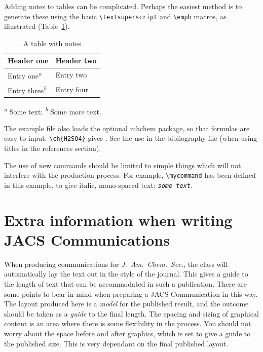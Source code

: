 \documentclass[journal=jpca,manuscript=article]{achemso}
\newcommand*\mycommand[1]{\texttt{\emph{#1}}}
\begin{document}
Adding notes to tables can be complicated.  Perhaps the easiest
method is to generate these using the basic
\texttt{\textbackslash textsuperscript} and
\texttt{\textbackslash emph} macros, as illustrated (Table~\ref{tbl:notes}).
\begin{table}
  \caption{A table with notes}
  \label{tbl:notes}
  \begin{tabular}{ll}
    \hline
    Header one                            & Header two \\
    \hline
    Entry one\textsuperscript{\emph{a}}   & Entry two  \\
    Entry three\textsuperscript{\emph{b}} & Entry four \\
    \hline
  \end{tabular}

  \textsuperscript{\emph{a}} Some text;
  \textsuperscript{\emph{b}} Some more text.
\end{table}

The example file also loads the optional \textsf{mhchem} package, so
that formulas are easy to input: \texttt{\textbackslash ch\{H2SO4\}}
gives .  See the use in the bibliography file (when using
titles in the references section).

The use of new commands should be limited to simple things which will
not interfere with the production process.  For example,
\texttt{\textbackslash mycommand} has been defined in this example,
to give italic, mono-spaced text: \mycommand{some text}.

\section{Extra information when writing JACS Communications}

When producing communications for \emph{J.~Am.\ Chem.\ Soc.}, the
class will automatically lay the text out in the style of the
journal. This gives a guide to the length of text that can be
accommodated in such a publication. There are some points to bear in
mind when preparing a JACS Communication in this way.  The layout
produced here is a \emph{model} for the published result, and the
outcome should be taken as a \emph{guide} to the final length. The
spacing and sizing of graphical content is an area where there is
some flexibility in the process.  You should not worry about the
space before and after graphics, which is set to give a guide to the
published size. This is very dependant on the final published layout.
\end{document}
